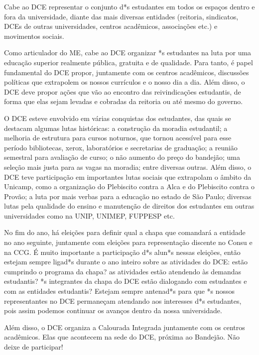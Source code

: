 Cabe ao DCE representar o conjunto d*s estudantes em todos os espaços dentro e
fora da universidade, diante das mais diversas entidades (reitoria, sindicatos,
DCEs de outras universidades, centros acadêmicos, associações etc.) e movimentos
sociais.

Como articulador do ME, cabe ao DCE organizar *s estudantes na luta por uma
educação superior realmente pública, gratuita e de qualidade. Para tanto, é
papel fundamental do DCE propor, juntamente com os centros acadêmicos,
discussões políticas que extrapolem os nossos currículos e o nosso dia a dia.
Além disso, o DCE deve propor ações que vão ao encontro das reivindicações
estudantis, de forma que elas sejam levadas e cobradas da reitoria ou até mesmo
do governo.

O DCE esteve envolvido em várias conquistas dos estudantes, das quais se
destacam algumas lutas históricas: a construção da moradia estudantil; a
melhoria de estrutura para cursos noturnos, que tornou acessível para esse
período bibliotecas, xerox, laboratórios e secretarias de graduação; a reunião
semestral para avaliação de curso; o não aumento do preço do bandejão; uma
seleção mais justa para as vagas na moradia; entre diversas outras. Além disso,
o DCE teve participação em importantes lutas sociais que extrapolam o âmbito da
Unicamp, como a organização do Plebiscito contra a Alca e do Plebiscito contra o
Provão; a luta por mais verbas para a educação no estado de São Paulo; diversas
lutas pela qualidade do ensino e manutenção de direitos dos estudantes em outras
universidades como na UNIP, UNIMEP, FUPPESP etc.

No fim do ano, há eleições para definir qual a chapa que comandará a entidade no
ano seguinte, juntamente com eleições para representação discente no Consu e na
CCG. É muito importante a participação d*s alun*s nessas eleições, então estejam 
sempre ligad*s durante o ano inteiro sobre as atividades do DCE: estão
cumprindo o programa da chapa? as atividades estão atendendo às demandas estudantis?
*s integrantes da chapa do DCE estão dialogando com estudantes e com as entidades
estudantis? 
Estejam sempre antenad*s para que *s nossos representantes no DCE permaneçam 
atendando aos interesses d*s estudantes, pois assim podemos continuar os avanços 
dentro da nossa universidade.

Além disso, o DCE organiza a Calourada Integrada juntamente com os centros
acadêmicos. Elas que acontecem na sede do DCE, próxima ao Bandejão. Não deixe
de participar!

